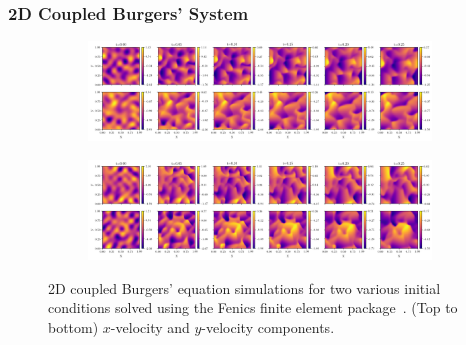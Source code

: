 \documentclass{beamer}
\theoremstyle{remark}
\begin{document}
\begin{frame}
\frametitle{2D Coupled Burgers' System}
\begin{figure}[H]
    \centering
    \begin{subfigure}{0.7\textwidth}
        \includegraphics[width=\textwidth]{Fig17a.png}
        \vspace*{-7mm}
    \end{subfigure}
    \begin{subfigure}{0.7\textwidth}
        \includegraphics[width=\textwidth]{Fig17b.png}
        \vspace*{-7mm}
    \end{subfigure}
    \caption{2D coupled Burgers' equation simulations for two various initial conditions solved using the Fenics finite element package~\cite{alnaes2015fenics}.
    (Top to bottom) $x$-velocity and $y$-velocity components.}
    \label{fig:burgers2D-fenics}
\end{figure}
\end{frame}
\end{document}
